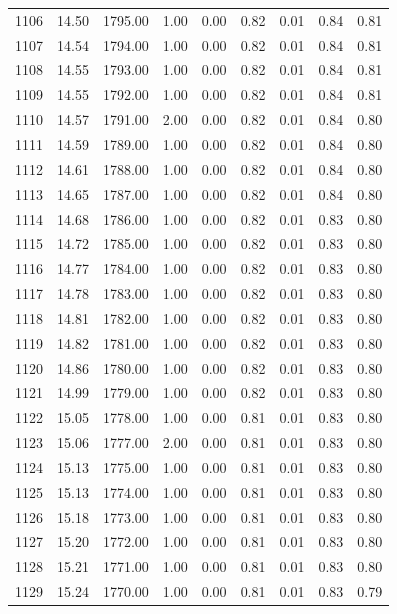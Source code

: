 \documentclass{article}\usepackage[]{graphicx}\usepackage[]{color}
\begin{document}
\begin{longtable}{rrrrrrrrr}
  1106 & 14.50 & 1795.00 & 1.00 & 0.00 & 0.82 & 0.01 & 0.84 & 0.81 \\ 
  1107 & 14.54 & 1794.00 & 1.00 & 0.00 & 0.82 & 0.01 & 0.84 & 0.81 \\ 
  1108 & 14.55 & 1793.00 & 1.00 & 0.00 & 0.82 & 0.01 & 0.84 & 0.81 \\ 
  1109 & 14.55 & 1792.00 & 1.00 & 0.00 & 0.82 & 0.01 & 0.84 & 0.81 \\ 
  1110 & 14.57 & 1791.00 & 2.00 & 0.00 & 0.82 & 0.01 & 0.84 & 0.80 \\ 
  1111 & 14.59 & 1789.00 & 1.00 & 0.00 & 0.82 & 0.01 & 0.84 & 0.80 \\ 
  1112 & 14.61 & 1788.00 & 1.00 & 0.00 & 0.82 & 0.01 & 0.84 & 0.80 \\ 
  1113 & 14.65 & 1787.00 & 1.00 & 0.00 & 0.82 & 0.01 & 0.84 & 0.80 \\ 
  1114 & 14.68 & 1786.00 & 1.00 & 0.00 & 0.82 & 0.01 & 0.83 & 0.80 \\ 
  1115 & 14.72 & 1785.00 & 1.00 & 0.00 & 0.82 & 0.01 & 0.83 & 0.80 \\ 
  1116 & 14.77 & 1784.00 & 1.00 & 0.00 & 0.82 & 0.01 & 0.83 & 0.80 \\ 
  1117 & 14.78 & 1783.00 & 1.00 & 0.00 & 0.82 & 0.01 & 0.83 & 0.80 \\ 
  1118 & 14.81 & 1782.00 & 1.00 & 0.00 & 0.82 & 0.01 & 0.83 & 0.80 \\ 
  1119 & 14.82 & 1781.00 & 1.00 & 0.00 & 0.82 & 0.01 & 0.83 & 0.80 \\ 
  1120 & 14.86 & 1780.00 & 1.00 & 0.00 & 0.82 & 0.01 & 0.83 & 0.80 \\ 
  1121 & 14.99 & 1779.00 & 1.00 & 0.00 & 0.82 & 0.01 & 0.83 & 0.80 \\ 
  1122 & 15.05 & 1778.00 & 1.00 & 0.00 & 0.81 & 0.01 & 0.83 & 0.80 \\ 
  1123 & 15.06 & 1777.00 & 2.00 & 0.00 & 0.81 & 0.01 & 0.83 & 0.80 \\ 
  1124 & 15.13 & 1775.00 & 1.00 & 0.00 & 0.81 & 0.01 & 0.83 & 0.80 \\ 
  1125 & 15.13 & 1774.00 & 1.00 & 0.00 & 0.81 & 0.01 & 0.83 & 0.80 \\ 
  1126 & 15.18 & 1773.00 & 1.00 & 0.00 & 0.81 & 0.01 & 0.83 & 0.80 \\ 
  1127 & 15.20 & 1772.00 & 1.00 & 0.00 & 0.81 & 0.01 & 0.83 & 0.80 \\ 
  1128 & 15.21 & 1771.00 & 1.00 & 0.00 & 0.81 & 0.01 & 0.83 & 0.80 \\ 
  1129 & 15.24 & 1770.00 & 1.00 & 0.00 & 0.81 & 0.01 & 0.83 & 0.79 \\ 

\end{longtable}
\end{document}

